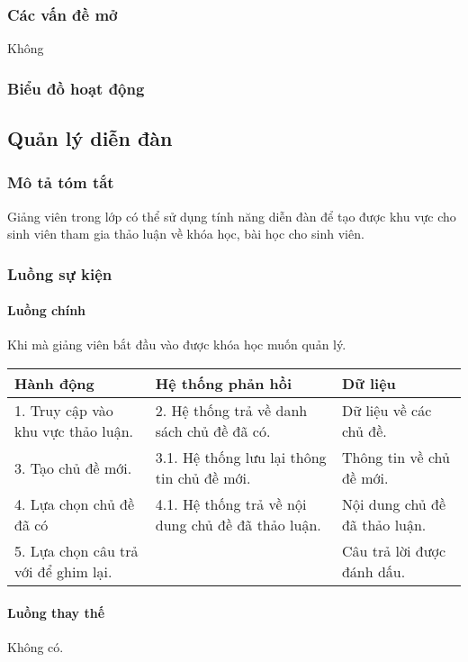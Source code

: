 \documentclass[./../main_file.tex]{subfiles}
\begin{document}
\subsubsection{Các vấn đề mở}
Không

\subsubsection{Biểu đồ hoạt động}

\subsection{Quản lý diễn đàn}

\subsubsection{Mô tả tóm tắt}
Giảng viên trong lớp có thể sử dụng tính năng diễn đàn để tạo được khu vực cho sinh viên tham gia thảo luận về khóa học, bài học cho sinh viên. 

\subsubsection{Luồng sự kiện}
\paragraph{Luồng chính}
Khi mà giảng viên bắt đầu vào được khóa học muốn quản lý.
\begin{longtable}{|p{}|p{}|p{}|}
		\hline
		\textbf{Hành động}                   & \textbf{Hệ thống phản hồi} & \textbf{Dữ liệu}           \\ \hline
		1. Truy cập vào khu vực thảo luận. & 2. Hệ thống trả về danh sách chủ đề đã có.         & Dữ liệu về các chủ đề.        \\ \hline
		3. Tạo chủ đề mới.                 & 3.1. Hệ thống lưu lại thông tin chủ đề mới.        & Thông tin về chủ đề mới.      \\ \hline
		4. Lựa chọn chủ đề đã có           & 4.1. Hệ thống trả về nội dung chủ đề đã thảo luận. & Nội dung chủ đề đã thảo luận. \\ \hline
		5. Lựa chọn câu trả với để ghim lại. &                            & Câu trả lời được đánh dấu. \\ \hline
\end{longtable}
\paragraph{Luồng thay thế}
	Không có.
\end{document}

